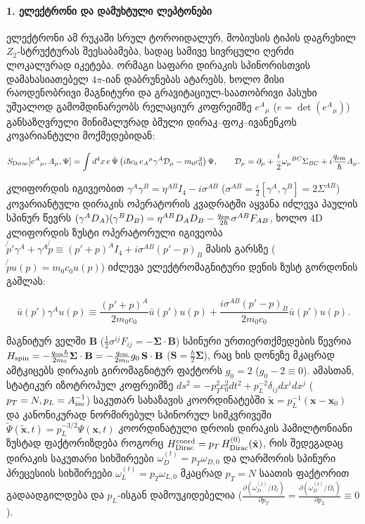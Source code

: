 \documentclass[11pt,a4paper]{article}
\begin{document}
\paragraph{1. ელექტრონი და დამუხტული ლეპტონები}

ელექტრონი ამ რუკაში სრულ ტოროიდალურ, მობიუსის ტიპის დაგრეხილ $Z_2$-სტრუქტურას შეესაბამება, სადაც სამივე სივრცული ღერძი ლოკალურად იკეტება. ორმაგი საფარი დირაკის სპინორისთვის დამახასიათებელ $4\pi$-იან დაბრუნებას ატარებს, ხოლო მისი რაოდენობრივი მაგნიტური და გრავიტაციულ-საათობრივი პასუხი უშუალოდ გამომდინარეობს რელაციურ კოფრეიმზე $e^A{}_\mu$ ($e = \det(e^A{}_\mu)$) განსაზღვრული მინიმალურად ბმული დირაკ–ფოკ–ივანენკოს კოვარიანტული მოქმედებიდან:

\[
S_{\rm Dirac}[e^A{}_\mu, A_\mu, \Psi] = \int d^4x\,e\,\bar{\Psi}\left(i\hbar c_0\,e_A{}^\mu\gamma^A\mathcal{D}_\mu - m_0 c_0^2\right)\Psi, \qquad \mathcal{D}_\mu = \partial_\mu + \frac{i}{2}\omega_\mu{}^{BC}\Sigma_{BC} + i\frac{q_{\rm em}}{\hbar}A_\mu.
\]

კლიფორდის იგივეობით $\gamma^A\gamma^B = \eta^{AB}I_4 - i\sigma^{AB}$ ($\sigma^{AB} = \frac{i}{2}[\gamma^A,\gamma^B] = 2\Sigma^{AB}$) კოვარიანტული დირაკის ოპერატორის კვადრატში აყვანა იძლევა პაულის სპინურ წევრს $(\gamma^A D_A)(\gamma^B D_B) = \eta^{AB}D_A D_B - \frac{q_{\rm em}}{2\hbar}\sigma^{AB}F_{AB}$, ხოლო 4D კლიფორდის ზუსტი ოპერატორული იგივეობა $\not{p}'\gamma^A + \gamma^A\not{p} \equiv (p'+p)^A I_4 + i\sigma^{AB}(p'-p)_B$ მასის გარსზე ($\not{p}u(p) = m_0 c_0 u(p)$) იძლევა ელექტრომაგნიტური დენის ზუსტ გორდონის გაშლას:

\[
\bar{u}(p')\gamma^A u(p) \equiv \frac{(p'+p)^A}{2 m_0 c_0}\bar{u}(p')u(p) + \frac{i\sigma^{AB}(p'-p)_B}{2 m_0 c_0}\bar{u}(p')u(p).
\]

მაგნიტურ ველში $\mathbf{B}$ ($\frac{1}{2}\sigma^{ij}F_{ij} = -\boldsymbol{\Sigma}\cdot\mathbf{B}$) სპინური ურთიერთქმედების წევრია $H_{\rm spin} = -\frac{q_{\rm em}\hbar}{2 m_0}\boldsymbol{\Sigma}\cdot\mathbf{B} = -\frac{q_{\rm em}}{2 m_0}g_0\,\mathbf{S}\cdot\mathbf{B}$ ($\mathbf{S} = \frac{\hbar}{2}\boldsymbol{\Sigma}$), რაც ხის დონეზე მკაცრად ამტკიცებს დირაკის გირომაგნიტურ ფაქტორს \textbf{$g_0 = 2$} ($g_0 - 2 \equiv 0$). ამასთან, სტატიკურ იზოტროპულ კოფრეიმზე $ds^2 = -p_T^2 c_0^2 dt^2 + p_L^{-2}\delta_{ij}dx^i dx^j$ ($p_T = N, p_L = A_{\rm iso}^{-1}$) საკუთარ სახაზავის კოორდინატებში $\tilde{\mathbf{x}} = p_L^{-1}(\mathbf{x}-\mathbf{x}_0)$ და კანონიკურად ნორმირებულ სპინორულ სიმკვრივეში $\widetilde{\Psi}(\tilde{\mathbf{x}},t) = p_L^{-3/2}\Psi(\mathbf{x},t)$ კოორდინატული დროის დირაკის ჰამილტონიანი ზუსტად ფაქტორიზდება როგორც $H_{\rm Dirac}^{\rm coord} = p_T\,H_{\rm Dirac}^{(0)}(\tilde{\mathbf{x}})$, რის შედეგადაც დირაკის საკუთარი სიხშირეები $\omega_D^{(t)} = p_T\omega_{D,0}$ და ლარმორის სპინური პრეცესიის სიხშირეები $\omega_L^{(t)} = p_T\omega_{L,0}$ მკაცრად $p_T = N$ საათის ფაქტორით გადაადგილდება და $p_L$-ისგან დამოუკიდებელია ($\frac{\partial(\omega_D^{(t)}/\Omega_t)}{\partial p_T} = \frac{\partial(\omega_D^{(t)}/\Omega_t)}{\partial p_L} \equiv 0$).
\end{document}
